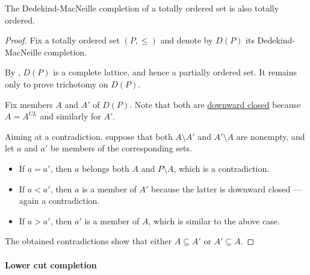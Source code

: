 \begin{proposition}\label{thm:dedekind_macnielle_closure_is_totally_ordered}
  The Dedekind-MacNeille completion of a totally ordered set is also totally ordered.
\end{proposition}
\begin{proof}
  Fix a totally ordered set \( (P, \leq) \) and denote by \( D(P) \) its Dedekind-MacNeille completion.

  By , \( D(P) \) is a complete lattice, and hence a partially ordered set. It remains only to prove trichotomy on \( D(P) \).

  Fix members \( A \) and \( A' \) of \( D(P) \). Note that both are \hyperref[def:closed_ordered_subset]{downward closed} because \( A = A^{UL} \) and similarly for \( A' \).

  Aiming at a contradiction, suppose that both \( A \setminus A' \) and \( A' \setminus A \) are nonempty, and let \( a \) and \( a' \) be members of the corresponding sets.

  \begin{itemize}
    \item If \( a = a' \), then \( a \) belongs both \( A \) and \( P \setminus A \), which is a contradiction.
    \item If \( a < a' \), then \( a \) is a member of \( A' \) because the latter is downward closed --- again a contradiction.
    \item If \( a > a' \), then \( a' \) is a member of \( A \), which is similar to the above case.
  \end{itemize}

  The obtained contradictions show that either \( A \subseteq A' \) or \( A' \subseteq A \).
\end{proof}

\paragraph{Lower cut completion}

